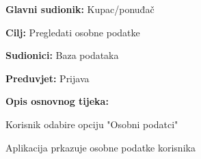 					\noindent {}
					\begin{packed_item}
						
						\item \textbf{Glavni sudionik: } Kupac/ponuđač
						\item  \textbf{Cilj:} Pregledati osobne podatke
						\item  \textbf{Sudionici:} Baza podataka
						\item  \textbf{Preduvjet:} Prijava
						\item  \textbf{Opis osnovnog tijeka:}
						
						\item[] \begin{packed_enum}
							
							\item Korisnik odabire opciju "Osobni podatci"
							\item Aplikacija prkazuje osobne podatke korisnika
							
							
							
						\end{packed_enum}
					\end{packed_item}
					
